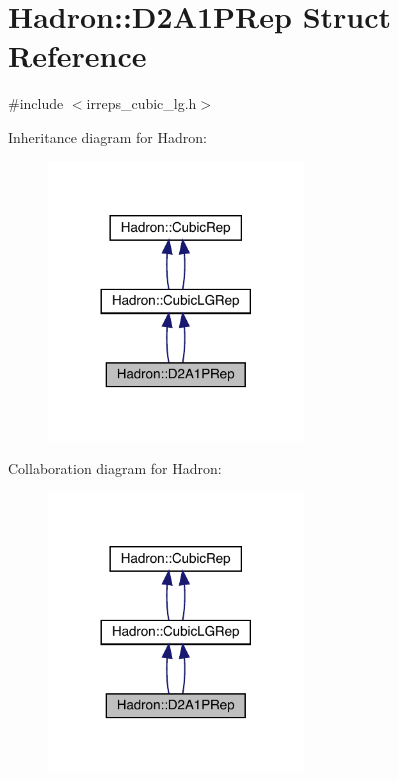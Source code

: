 \hypertarget{structHadron_1_1D2A1PRep}{}\section{Hadron\+:\+:D2\+A1\+P\+Rep Struct Reference}
\label{structHadron_1_1D2A1PRep}


{\ttfamily \#include $<$irreps\+\_\+cubic\+\_\+lg.\+h$>$}



Inheritance diagram for Hadron\+:\nopagebreak
\begin{figure}[H]
\begin{center}
\leavevmode
\includegraphics[width=192pt]{db/d77/structHadron_1_1D2A1PRep__inherit__graph}
\end{center}
\end{figure}


Collaboration diagram for Hadron\+:\nopagebreak
\begin{figure}[H]
\begin{center}
\leavevmode
\includegraphics[width=192pt]{dc/d1c/structHadron_1_1D2A1PRep__coll__graph}
\end{center}
\end{figure}

